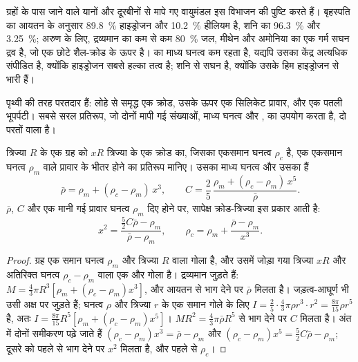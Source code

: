 ग्रहों के पास जाने वाले यानों और दूरबीनों से मापे गए वायुमंडल इस विभाजन की पुष्टि करते हैं।
बृहस्पति का आयतन के अनुसार \qty{89.8}{\percent} हाइड्रोजन और \qty{10.2}{\percent} हीलियम है, शनि का
\qty{96.3}{\percent} और \qty{3.25}{\percent}; अरुण के लिए, द्रव्यमान का कम से कम \qty{80}{\percent}
जल, मीथेन और अमोनिया का एक गर्म सघन द्रव है, जो एक छोटे शैल-क्रोड के ऊपर है।  का माध्य
घनत्व कम रहता है, यद्यपि उसका केंद्र अत्यधिक संपीडित है, क्योंकि हाइड्रोजन सबसे हल्का तत्व है;  शनि से सघन है, क्योंकि उसके हिम हाइड्रोजन से भारी हैं।

 पृथ्वी की तरह परतदार हैं: लोहे से समृद्ध एक क्रोड, उसके ऊपर एक सिलिकेट प्रावार, और एक पतली
भूपर्पटी। सबसे सरल प्रतिरूप, जो दोनों मापी गई संख्याओं, माध्य घनत्व और , का
उपयोग करता है, दो परतों वाला है।

\begin{proposition}[दो-परत वाला ग्रह]\label{prop:b1:comparative-planetology:two-layer}
त्रिज्या $R$ के एक ग्रह को $xR$ त्रिज्या के एक क्रोड का, जिसका एकसमान घनत्व $\rho_c$ है, एक
एकसमान घनत्व $\rho_m$ वाले प्रावार के भीतर होने का प्रतिरूप मानिए। उसका माध्य घनत्व और उसका
 हैं
\[
  \bar\rho = \rho_m + (\rho_c - \rho_m)\,x^3 , \qquad
  C = \frac25\,\frac{\rho_m + (\rho_c - \rho_m)\,x^5}{\bar\rho} .
\]
$\bar\rho$, $C$ और एक मानी गई प्रावार घनत्व $\rho_m$ दिए होने पर, सापेक्ष क्रोड-त्रिज्या इस प्रकार आती है:
\[
  x^2 = \frac{\tfrac52C\bar\rho - \rho_m}{\bar\rho - \rho_m} ,
  \qquad \rho_c = \rho_m + \frac{\bar\rho - \rho_m}{x^3} .
\]
\end{proposition}

\begin{proof}
ग्रह एक समान घनत्व $\rho_m$ और त्रिज्या $R$ वाला गोला है, और उसमें जोड़ा गया त्रिज्या $xR$ और अतिरिक्त घनत्व
$\rho_c - \rho_m$ वाला एक और गोला है। द्रव्यमान जुड़ते हैं:
$M = \tfrac43\pi R^3[\rho_m + (\rho_c - \rho_m)x^3]$, और आयतन से भाग देने पर $\bar\rho$ मिलता है।
जड़त्व-आघूर्ण भी उसी अक्ष पर जुड़ते हैं; घनत्व $\rho$ और त्रिज्या $r$ के एक समान गोले के लिए
$I = \tfrac25\cdot\tfrac43\pi\rho r^3\cdot r^2 = \tfrac{8\pi}{15}\rho r^5$ है,
अतः $I = \tfrac{8\pi}{15}R^5[\rho_m + (\rho_c - \rho_m)x^5]$। $MR^2 = \tfrac43\pi\bar\rho R^5$
से भाग देने पर $C$ मिलता है। अंत में दोनों समीकरण पढ़े जाते हैं
$(\rho_c - \rho_m)x^3 = \bar\rho - \rho_m$ और $(\rho_c - \rho_m)x^5 =
\tfrac52C\bar\rho - \rho_m$; दूसरे को पहले से भाग देने पर $x^2$ मिलता है, और पहले से $\rho_c$।
\end{proof}

